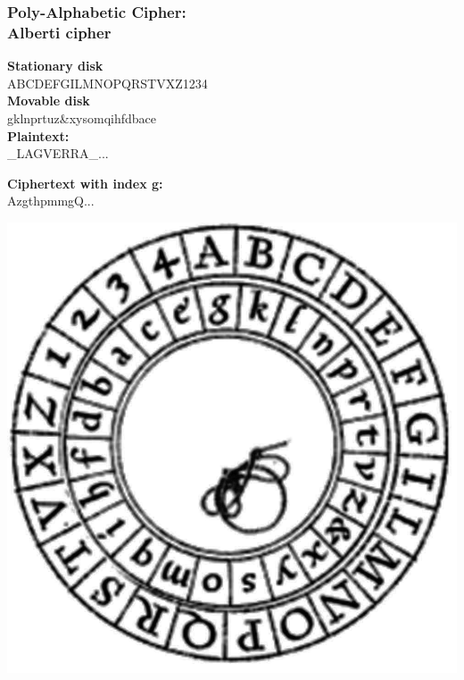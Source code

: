 \documentclass{uva-inf-presentation}
\begin{document}
\begin{frame}
\frametitle{Poly-Alphabetic Cipher:\\ Alberti cipher}

\begin{minipage}{0.55\linewidth}
\textbf{Stationary disk}\\
ABCDEFGILMNOPQRSTVXZ1234\\
\textbf{Movable disk}\\
gklnprtuz\&xysomqihfdbace\\

\textbf{Plaintext:}\\
\hspace{4ex}\_LAGVERRA\_...

\textbf{Ciphertext with index g:}\\
\hspace{4ex}AzgthpmmgQ...
\end{minipage}%
\begin{minipage}{0.45\linewidth}
\includegraphics[width=\linewidth]{Alberti_cipher_disk.JPG}
\end{minipage}
\end{frame}
\end{document}
